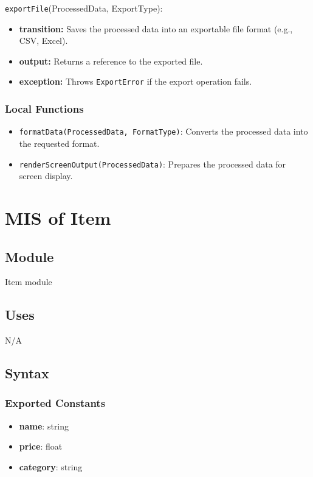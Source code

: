 \documentclass[12pt, titlepage]{article}
\begin{document}
\noindent \texttt{exportFile}(ProcessedData, ExportType):
\begin{itemize}
    \item \textbf{transition:} Saves the processed data into an exportable file format (e.g., CSV, Excel).
    \item \textbf{output:} Returns a reference to the exported file.
    \item \textbf{exception:} Throws \texttt{ExportError} if the export operation fails.
\end{itemize}

\subsubsection{Local Functions}

\begin{itemize}
    \item \texttt{formatData(ProcessedData, FormatType)}: Converts the processed data into the requested format.
    \item \texttt{renderScreenOutput(ProcessedData)}: Prepares the processed data for screen display.
\end{itemize}

\newpage


\section{MIS of Item}\label{item_module}

\subsection{Module}

Item module

\subsection{Uses}
N/A

\subsection{Syntax}

\subsubsection{Exported Constants}
\begin{itemize}
  \item \textbf{name}: string
  \item \textbf{price}: float
  \item \textbf{category}: string
\end{itemize}
\end{document}
